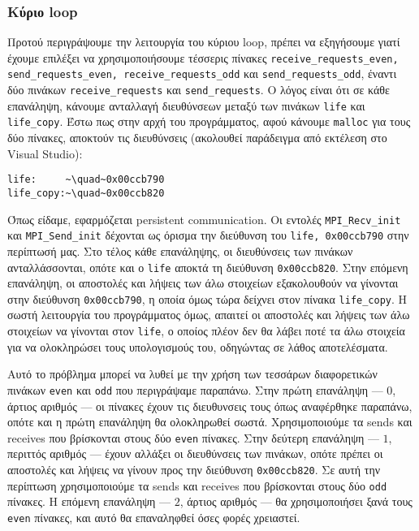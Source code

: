 \subsubsection{Κύριο loop}
\begin{multicols}{2}
Προτού περιγράψουμε την λειτουργία του κύριου loop, πρέπει να εξηγήσουμε γιατί έχουμε επιλέξει να χρησιμοποιήσουμε τέσσερις πίνακες \texttt{receive_requests_even, send_requests_even, receive_requests_odd} και \texttt{send_requests_odd}, έναντι δύο πινάκων \texttt{receive_requests} και \texttt{send_requests}. Ο λόγος είναι ότι σε κάθε επανάληψη, κάνουμε ανταλλαγή διευθύνσεων μεταξύ των πινάκων \texttt{life} και \texttt{life_copy}. Έστω πως στην αρχή του προγράμματος, αφού κάνουμε \texttt{malloc} για τους δύο πίνακες, αποκτούν τις διευθύνσεις (ακολουθεί παράδειγμα από εκτέλεση στο Visual Studio): 

\begin{verbatim}
life:     ~\quad~0x00ccb790
life_copy:~\quad~0x00ccb820
\end{verbatim}

Όπως είδαμε, εφαρμόζεται persistent communication. Οι εντολές \texttt{MPI_Recv_init} και \texttt{MPI_Send_init} δέχονται ως όρισμα την διεύθυνση του \texttt{life, 0x00ccb790} στην περίπτωσή μας. Στο τέλος κάθε επανάληψης, οι διευθύνσεις των πινάκων ανταλλάσσονται, οπότε και ο \texttt{life} αποκτά τη διεύθυνση \texttt{0x00ccb820}. Στην επόμενη επανάληψη, οι αποστολές και λήψεις των άλω στοιχείων εξακολουθούν να γίνονται στην διεύθυνση \texttt{0x00ccb790}, η οποία όμως τώρα δείχνει στον πίνακα \texttt{life_copy}. Η σωστή λειτουργία του προγράμματος όμως, απαιτεί οι αποστολές και λήψεις των άλω στοιχείων να γίνονται στον \texttt{life}, ο οποίος πλέον δεν θα λάβει ποτέ τα άλω στοιχεία για να ολοκληρώσει τους υπολογισμούς του, οδηγώντας σε λάθος αποτελέσματα. \par

Αυτό το πρόβλημα μπορεί να λυθεί με την χρήση των τεσσάρων διαφορετικών πινάκων \texttt{even} και \texttt{odd} που περιγράψαμε παραπάνω. Στην πρώτη επανάληψη --- $0$, άρτιος αριθμός --- οι πίνακες έχουν τις διευθυνσεις τους όπως αναφέρθηκε παραπάνω, οπότε και η πρώτη επανάληψη θα ολοκληρωθεί σωστά. Χρησιμοποιούμε τα sends και receives που βρίσκονται στους δύο \texttt{even} πίνακες. Στην δεύτερη επανάληψη --- $1$, περιττός αριθμός --- έχουν αλλάξει οι διευθύνσεις των πινάκων, οπότε πρέπει οι αποστολές και λήψεις να γίνουν προς την διεύθυνση \texttt{0x00ccb820}. Σε αυτή την περίπτωση χρησιμοποιούμε τα sends και receives που βρίσκονται στους δύο \texttt{odd} πίνακες. Η επόμενη επανάληψη --- $2$, άρτιος αριθμός --- θα χρησιμοποιήσει ξανά τους \texttt{even} πίνακες, και αυτό θα επαναληφθεί όσες φορές χρειαστεί. \par


\end{multicols}

